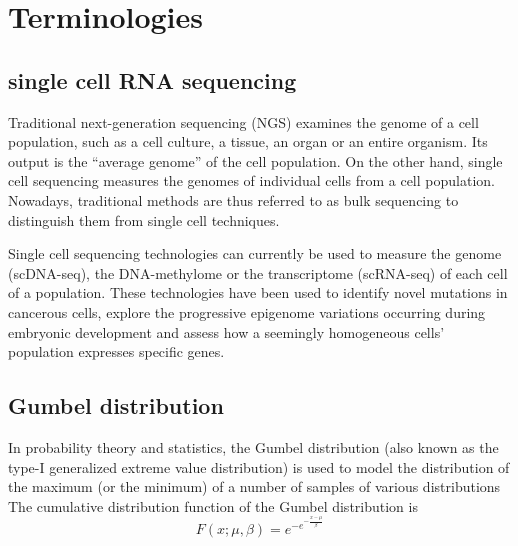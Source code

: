 \documentclass[12 pts]{article}
\begin{document}
\section{Terminologies}

\subsection{single cell RNA sequencing}
Traditional next-generation sequencing (NGS) examines the genome of a cell population, such as a cell culture, a tissue, an organ or an entire organism. Its output is the “average genome” of the cell population. On the other hand, single cell sequencing measures the genomes of individual cells from a cell population. Nowadays, traditional methods are thus referred to as bulk sequencing to distinguish them from single cell techniques.

Single cell sequencing technologies can currently be used to measure the genome (scDNA-seq), the DNA-methylome or the transcriptome (scRNA-seq) of each cell of a population. These technologies have been used to identify novel mutations in cancerous cells, explore the progressive epigenome variations occurring during embryonic development and assess how a seemingly homogeneous cells’ population expresses specific genes.


\subsection{Gumbel distribution}
In probability theory and statistics, the Gumbel distribution (also known as the type-I generalized extreme value distribution) is used to model the distribution of the maximum (or the minimum) of a number of samples of various distributions
The cumulative distribution function of the Gumbel distribution is
\begin{equation}
F(x;\mu,\beta) = e^{-e^{-\frac{x-\mu}{\beta}}}
\label{Gumbel distribution}
\end{equation}
\end{document}
